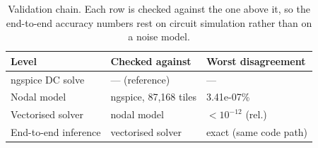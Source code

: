 \begin{table}[t]
\centering
\caption{Validation chain. Each row is checked against the one above it, so the end-to-end accuracy numbers rest on circuit simulation rather than on a noise model.}
\label{tab:validation}
\begin{tabular}{lll}
\toprule
Level & Checked against & Worst disagreement \\
\midrule
ngspice DC solve & --- (reference) & --- \\
Nodal model & ngspice, 87,168 tiles & 3.41e-07\% \\
Vectorised solver & nodal model & $<10^{-12}$ (rel.) \\
End-to-end inference & vectorised solver & exact (same code path) \\
\bottomrule
\end{tabular}
\end{table}
